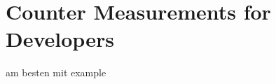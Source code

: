 \chapter{Counter Measurements for Developers}\label{chapter:countermeasurements}

am besten mit example




